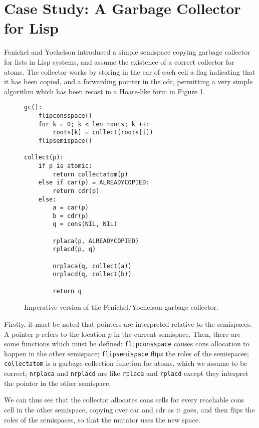 \section{Case Study: A Garbage Collector for Lisp}
\label{sec:copying-example}

Fenichel and Yochelson\cite{Fenichel69} introduced a simple semispace
copying garbage collector for lists in Lisp systems, and assume the
existence of a correct collector for atoms. The collector works by
storing in the car of each cell a flag indicating that it has been
copied, and a forwarding pointer in the cdr, permitting a very simple
algorithm which has been recast in a Hoare-like form in Figure
\ref{fig:copying-example-algo}.

\begin{figure}[t]
  \centering
  \begin{lstlisting}
gc():
    flipconsspace()
    for k = 0; k < len roots; k ++:
        roots[k] = collect(roots[i])
    flipsemispace()

collect(p):
    if p is atomic:
        return collectatom(p)
    else if car(p) = ALREADYCOPIED:
        return cdr(p)
    else:
        a = car(p)
        b = cdr(p)
        q = cons(NIL, NIL)

        rplaca(p, ALREADYCOPIED)
        rplacd(p, q)

        nrplaca(q, collect(a))
        nrplacd(q, collect(b))

        return q
  \end{lstlisting}
  \caption{Imperative version of the Fenichel/Yochelson garbage collector.}
  \label{fig:copying-example-algo}
\end{figure}

Firstly, it must be noted that pointers are interpreted relative to
the semispaces. A pointer $p$ refers to the location $p$ in the
current semispace. Then, there are some functions which must be
defined: \texttt{flipconsspace} causes cons allocation to happen in
the other semispace; \texttt{flipsemispace} flips the roles of the
semispaces; \texttt{collectatom} is a garbage collection function for
atoms, which we assume to be correct; \texttt{nrplaca} and
\texttt{nrplacd} are like \texttt{rplaca} and \texttt{rplacd} except
they interpret the pointer in the other semispace.

We can thus see that the collector allocates cons cells for every
reachable cons cell in the other semispace, copying over car and cdr
as it goes, and then flips the roles of the semispaces, so that the
mutator uses the new space.

